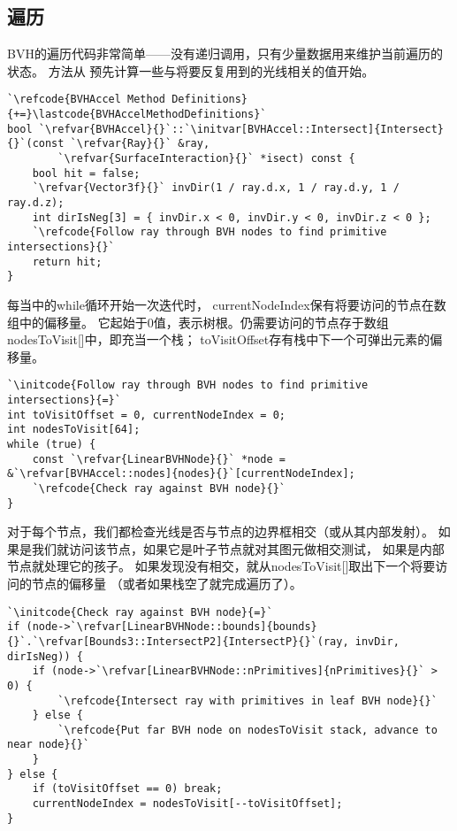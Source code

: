 \subsection{遍历}\label{sub:遍历}
BVH的遍历代码非常简单——没有递归调用，只有少量数据用来维护当前遍历的状态。
方法从
预先计算一些与将要反复用到的光线相关的值开始。
\begin{lstlisting}
`\refcode{BVHAccel Method Definitions}{+=}\lastcode{BVHAccelMethodDefinitions}`
bool `\refvar{BVHAccel}{}`::`\initvar[BVHAccel::Intersect]{Intersect}{}`(const `\refvar{Ray}{}` &ray,
        `\refvar{SurfaceInteraction}{}` *isect) const {
    bool hit = false;
    `\refvar{Vector3f}{}` invDir(1 / ray.d.x, 1 / ray.d.y, 1 / ray.d.z);
    int dirIsNeg[3] = { invDir.x < 0, invDir.y < 0, invDir.z < 0 };
    `\refcode{Follow ray through BVH nodes to find primitive intersections}{}`
    return hit;
}
\end{lstlisting}

每当中的{\ttfamily while}循环开始一次迭代时，
{\ttfamily currentNodeIndex}保有将要访问的节点在数组中的偏移量。
它起始于0值，表示树根。仍需要访问的节点存于数组{\ttfamily nodesToVisit[]}中，即充当一个栈；
{\ttfamily toVisitOffset}存有栈中下一个可弹出元素的偏移量。
\begin{lstlisting}
`\initcode{Follow ray through BVH nodes to find primitive intersections}{=}`
int toVisitOffset = 0, currentNodeIndex = 0;
int nodesToVisit[64];
while (true) {
    const `\refvar{LinearBVHNode}{}` *node = &`\refvar[BVHAccel::nodes]{nodes}{}`[currentNodeIndex];
    `\refcode{Check ray against BVH node}{}`
}
\end{lstlisting}

对于每个节点，我们都检查光线是否与节点的边界框相交（或从其内部发射）。
如果是我们就访问该节点，如果它是叶子节点就对其图元做相交测试，
如果是内部节点就处理它的孩子。
如果发现没有相交，就从{\ttfamily nodesToVisit[]}取出下一个将要访问的节点的偏移量
（或者如果栈空了就完成遍历了）。
\begin{lstlisting}
`\initcode{Check ray against BVH node}{=}`
if (node->`\refvar[LinearBVHNode::bounds]{bounds}{}`.`\refvar[Bounds3::IntersectP2]{IntersectP}{}`(ray, invDir, dirIsNeg)) {
    if (node->`\refvar[LinearBVHNode::nPrimitives]{nPrimitives}{}` > 0) {
        `\refcode{Intersect ray with primitives in leaf BVH node}{}`
    } else {
        `\refcode{Put far BVH node on nodesToVisit stack, advance to near node}{}`
    }
} else {
    if (toVisitOffset == 0) break;
    currentNodeIndex = nodesToVisit[--toVisitOffset];
}
\end{lstlisting}

